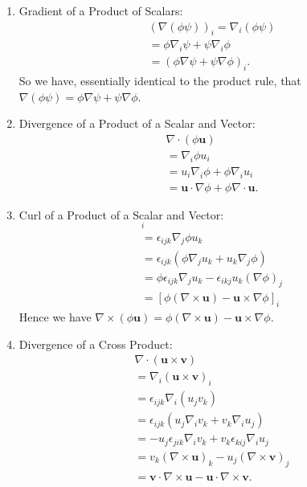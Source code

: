 \documentclass[]{article}
\begin{document}
\begin{enumerate}
		\item Gradient of a Product of Scalars:
				\begin{align*}
						(\nabla (\phi\psi))_i = \nabla_i (\phi\psi) \\
						= \phi \nabla_i \psi + \psi \nabla_i \phi \\
						= (\phi \nabla \psi + \psi \nabla \phi)_i.
				\end{align*}
				So we have, essentially identical to the product rule, that $\nabla(\phi\psi) = \phi \nabla \psi + \psi \nabla \phi$.
		\item Divergence of a Product of a Scalar and Vector:
				\begin{align*}
						\nabla \cdot (\phi \mathbf{u}) \\
						= \nabla_i \phi u_i \\
						= u_i \nabla_i \phi + \phi \nabla_i u_i \\
						= \mathbf{u} \cdot \nabla \phi + \phi \nabla \cdot \mathbf{u}.
				\end{align*}
		\item Curl of a Product of a Scalar and Vector:
				\begin{align*}
						[\nabla \times (\phi \mathbf{u})]_i \\
						= \epsilon_{ijk} \nabla_j \phi u_k \\
						= \epsilon_{ijk}(\phi \nabla_j u_k + u_k \nabla_j \phi) \\
						= \phi \epsilon_{ijk} \nabla_j u_k - \epsilon_{ikj} u_k (\nabla\phi)_j \\
						= [\phi(\nabla \times \mathbf{u}) - \mathbf{u} \times \nabla\phi]_i
				\end{align*}
				Hence we have $\nabla \times (\phi \mathbf{u}) = \phi(\nabla\times\mathbf{u}) - \mathbf{u} \times \nabla\phi$.

		\item Divergence of a Cross Product:
				\begin{align*}
						\nabla \cdot (\mathbf{u} \times \mathbf{v}) \\
						= \nabla_i (\mathbf{u} \times \mathbf{v})_i \\
						= \epsilon_{ijk} \nabla_i (u_j v_k) \\
						= \epsilon_{ijk} (u_j \nabla_i v_k + v_k \nabla_i u_j) \\
						= -u_j \epsilon_{jik} \nabla_i v_k + v_k \epsilon_{kij} \nabla_i u_j \\
						= v_k (\nabla \times \mathbf{u})_k - u_j (\nabla \times \mathbf{v})_j \\
						= \mathbf{v} \cdot \nabla \times \mathbf{u} - \mathbf{u} \cdot \nabla \times \mathbf{v}.
				\end{align*}


\end{enumerate}
\end{document}
